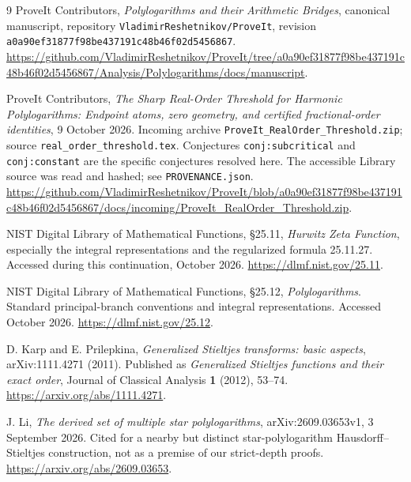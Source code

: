 \documentclass[11pt]{article}
\numberwithin{equation}{section}
\theoremstyle{definition}
\theoremstyle{remark}
\newcommand{\basecommit}{\nolinkurl{a0a90ef31877f98be437191c48b46f02d5456867}}
\begin{document}
\clearpage
{}
\begin{thebibliography}{9}
ProveIt Contributors,
\emph{Polylogarithms and their Arithmetic Bridges}, canonical manuscript,
repository \texttt{VladimirReshetnikov/ProveIt}, revision \basecommit.
\url{https://github.com/VladimirReshetnikov/ProveIt/tree/a0a90ef31877f98be437191c48b46f02d5456867/Analysis/Polylogarithms/docs/manuscript}.

ProveIt Contributors,
\emph{The Sharp Real-Order Threshold for Harmonic Polylogarithms:
Endpoint atoms, zero geometry, and certified fractional-order identities},
9 October 2026. Incoming archive
\texttt{ProveIt\_RealOrder\_Threshold.zip}; source
\texttt{real\_order\_threshold.tex}.
Conjectures \texttt{conj:subcritical} and \texttt{conj:constant} are the
specific conjectures resolved here. The accessible Library source was
read and hashed; see \texttt{PROVENANCE.json}.
\url{https://github.com/VladimirReshetnikov/ProveIt/blob/a0a90ef31877f98be437191c48b46f02d5456867/docs/incoming/ProveIt_RealOrder_Threshold.zip}.

NIST Digital Library of Mathematical Functions,
\S25.11, \emph{Hurwitz Zeta Function}, especially the integral
representations and the regularized formula 25.11.27.
Accessed during this continuation, October 2026.
\url{https://dlmf.nist.gov/25.11}.

NIST Digital Library of Mathematical Functions,
\S25.12, \emph{Polylogarithms}. Standard principal-branch conventions and
integral representations. Accessed October 2026.
\url{https://dlmf.nist.gov/25.12}.

D. Karp and E. Prilepkina,
\emph{Generalized Stieltjes transforms: basic aspects},
arXiv:1111.4271 (2011). Published as
\emph{Generalized Stieltjes functions and their exact order},
Journal of Classical Analysis \textbf{1} (2012), 53--74.
\url{https://arxiv.org/abs/1111.4271}.

J. Li,
\emph{The derived set of multiple star polylogarithms},
arXiv:2609.03653v1, 3 September 2026. Cited for a nearby but distinct
star-polylogarithm Hausdorff--Stieltjes construction, not as a premise of
our strict-depth proofs.
\url{https://arxiv.org/abs/2609.03653}.
\end{thebibliography}
\end{document}
